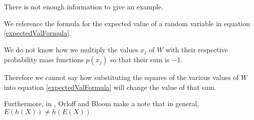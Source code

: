 \documentclass[a4paper,11pt]{article}
\begin{document}
There is not enough information to give an example.

We reference the formula for the expected value of a random variable
in equation \ref{expectedValFormula}.

We do not know how we multiply the values $x_{j}$ of $W$ with their
respective probability mass functions $p \left( x_{j} \right)$ so that
their sum is $-1$.

Therefore we cannot say how substituting the squares of the various
values of $W$ into equation \ref{expectedValFormula} will change the
value of that sum.

Furthermore, in \cite{reading4bQ}, Orloff and Bloom make a note that
in general, $E \left( h \left( X \right) \right) 
  \neq h \left( E \left( X \right) \right)$
\printbibliography{}
\end{document}
